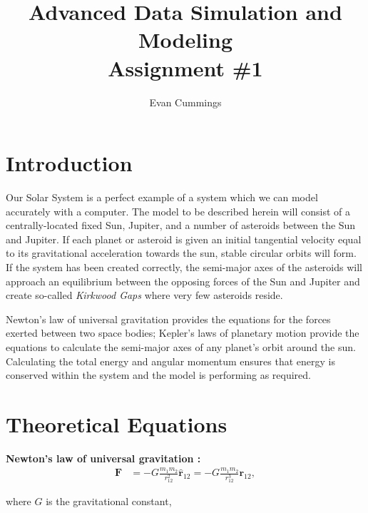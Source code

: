 \documentclass{article}%
\begin{document}
\title{Advanced Data Simulation and Modeling\\
       Assignment \#1}
\author{Evan Cummings}
\maketitle

\twocolumn

\section{Introduction}

Our Solar System is a perfect example of a system which we can model accurately with a computer.  The model to be described herein will consist of a centrally-located fixed Sun, Jupiter, and a number of asteroids between the Sun and Jupiter.  If each planet or asteroid is given an initial tangential velocity equal to its gravitational acceleration towards the sun, stable circular orbits will form.  If the system has been created correctly, the semi-major axes of the asteroids will approach an equilibrium between the opposing forces of the Sun and Jupiter and create so-called \emph{Kirkwood Gaps} where very few asteroids reside.

Newton's law of universal gravitation provides the equations for the forces exerted between two space bodies; Kepler's laws of planetary motion provide the equations to calculate the semi-major axes of any planet's orbit around the sun. Calculating the total energy and angular momentum ensures that energy is conserved within the system and the model is performing as required.




\section{Theoretical Equations}

\textbf{Newton's law of universal gravitation :}
\begin{align}
	\mathbf{F}  &= -G \frac{m_1 m_2}{r_{12}^2} \mathbf{\hat{r}}_{12} = -G \frac{m_1 m_2}{r_{12}^3} \mathbf{r}_{12},
\end{align}

where $G$ is the gravitational constant, 
\end{document}
